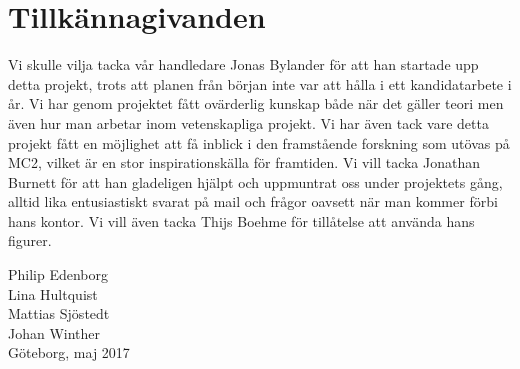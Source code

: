 \documentclass[../../main.tex]{subfiles}
\begin{document}
\thispagestyle{plain}			%
\section*{Tillkännagivanden}

Vi skulle vilja tacka vår handledare Jonas Bylander för att han startade upp detta projekt, trots att planen från början inte var att hålla i ett kandidatarbete i år. Vi har genom projektet fått ovärderlig kunskap både när det gäller teori men även hur man arbetar inom vetenskapliga projekt. Vi har även tack vare detta projekt fått en möjlighet att få inblick i den framstående forskning som utövas på MC2, vilket är en stor inspirationskälla för framtiden.  Vi vill tacka Jonathan Burnett för att han gladeligen hjälpt och uppmuntrat oss under projektets gång, alltid lika entusiastiskt svarat på mail och frågor oavsett när man kommer förbi hans kontor. Vi vill även tacka Thijs Boehme för tillåtelse att använda hans figurer.



\vspace{1.5cm}
\hfill
\begin{center}
Philip Edenborg\\Lina Hultquist\\Mattias Sjöstedt\\Johan Winther\\ Göteborg, maj 2017
\end{center}

\newpage\null\thispagestyle{empty}\newpage
\end{document}
